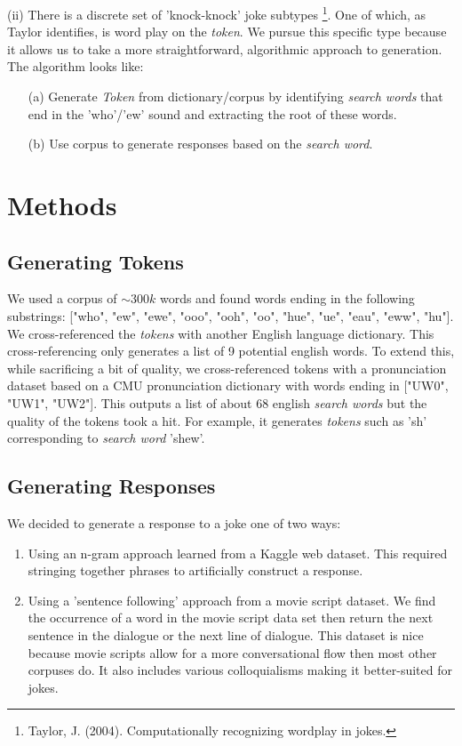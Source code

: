 \documentclass[twoside,twocolumn]{article}
\begin{document}
\noindent (ii) There is a discrete set of 'knock-knock' joke subtypes \footnote{Taylor, J. (2004). Computationally recognizing wordplay in jokes.}.
One of which, as Taylor identifies, is word play on the \emph{token}. We pursue this specific type because it allows us to take a more straightforward, algorithmic approach to generation.
The algorithm looks like:
\begin{center}
    \begin{enumerate}
    \item[(a)] Generate \emph{Token} from dictionary/corpus by identifying \emph{search words} that end in the 'who'/'ew' sound and extracting the root of these words.
    \item[(b)] Use corpus to generate responses based on the \emph{search word}.
    \end{enumerate}
\end{center}



\section{Methods}

\subsection{Generating Tokens}

We used a corpus of $\sim 300k$ words and found words ending in the following substrings: ["who", "ew", "ewe", "ooo", "ooh", "oo", "hue", "ue", "eau", "eww", "hu"].  We cross-referenced the \emph{tokens} with another English language dictionary. This cross-referencing only generates a list of 9 potential english words. To extend this, while sacrificing a bit of quality, we cross-referenced tokens with a pronunciation dataset based on a CMU pronunciation dictionary with words ending in ["UW0", "UW1", "UW2"]. This outputs a list of about 68 english \emph{search words} but the quality of the tokens took a hit. For example, it generates \emph{tokens} such as 'sh' corresponding to \emph{search word} 'shew'. 

\subsection{Generating Responses}
We decided to generate a response to a joke one of two ways:
\begin{enumerate}[label=(\roman*)]
\item Using an n-gram approach learned from a Kaggle web dataset. This required stringing together phrases to artificially construct a response.
\item Using a 'sentence following' approach from a movie script dataset. We find the occurrence of a word in the movie script data set then return the next sentence in the dialogue or the next line of dialogue. This dataset is nice because movie scripts allow for a more conversational flow then most other corpuses do. It also includes various colloquialisms making it better-suited for jokes.
\end{enumerate}
\end{document}
